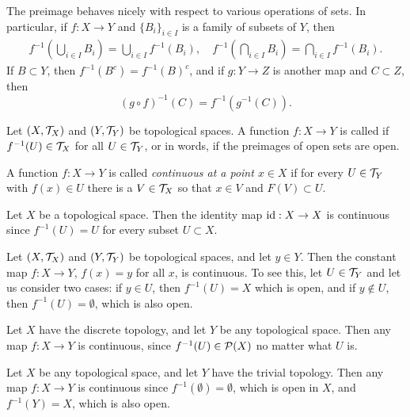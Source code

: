 \begin{prop}
  \label{preimage-props}
  The preimage behaves nicely with respect to various operations of sets. In particular, if $f : X \to Y$ and $\{B_i\}_{i \in I}$ is a family of subsets of $Y$, then
  \begin{align*}
    f^{-1}\left( \bigcup_{i \in I} B_i \right) = \bigcup_{i \in I} f^{-1}(B_i), \quad f^{-1}\left( \bigcap_{i \in I} B_i \right) = \bigcap_{i \in I} f^{-1}(B_i).
  \end{align*}
  If $B \subset Y$, then $f^{-1}(B^c) = f^{-1}(B)^c$, and if $g : Y \to Z$ is another map and $C \subset Z$, then
  \[
    (g \circ f)^{-1}(C) = f^{-1}(g^{-1}(C)).
  \]
\end{prop}
\begin{defn}
  \label{continuity-def}
  Let $(X,\mathcal{T}_X)$ and $(Y,\mathcal{T}_Y)$ be topological spaces. A function $f : X \to Y$ is called  if $f^{-1}(U) \in \mathcal{T}_X$ for all $U \in \mathcal{T}_Y$, or in words, if the preimages of open sets are open.
  
  A function $f : X \to Y$ is called \emph{continuous at a point $x \in X$} if for every $U \in \mathcal{T}_Y$ with $f(x) \in U$ there is a $V \in \mathcal{T}_X$ so that $x \in V$ and $F(V) \subset U$.
\end{defn}
\begin{example}
  Let $X$ be a topological space. Then the identity map $\mathrm{id} : X \to X$ is continuous since $f^{-1}(U) = U$ for every subset $U \subset X$.
\end{example}
\begin{example}
  Let $(X,\mathcal{T}_X)$ and $(Y,\mathcal{T}_Y)$ be topological spaces, and let $y \in Y$. Then the constant map $f : X \to Y$, $f(x) = y$ for all $x$, is continuous. To see this, let $U \in \mathcal{T}_Y$ and let us consider two cases: if $y \in U$, then $f^{-1}(U) = X$ which is open, and if $y \notin U$, then $f^{-1}(U) = \emptyset$, which is also open.
\end{example}
\begin{example}
  Let $X$ have the discrete topology, and let $Y$ be any topological space. Then any map $f : X \to Y$ is continuous, since $f^{-1}(U) \in \mathcal{P}(X)$ no matter what $U$ is.
\end{example}
\begin{example}
  Let $X$ be any topological space, and let $Y$ have the trivial topology. Then any map $f : X \to Y$ is continuous since $f^{-1}(\emptyset) = \emptyset$, which is open in $X$, and $f^{-1}(Y) = X$, which is also open.
\end{example}
